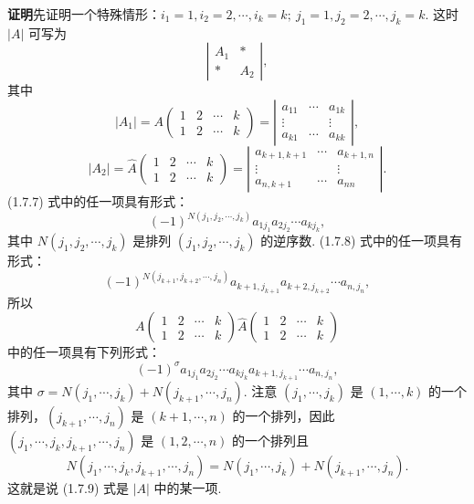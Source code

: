 \documentclass[UTF8, 12pt, fontset=fandol, oneside]{ctexart}
\begin{document}
\noindent\textbf{证明}\quad 先证明一个特殊情形：$i_1=1,i_2=2,\cdots,i_k=k;\ j_1=1,j_2=2,\cdots,j_k=k$. 这时 $|A|$ 可写为
\begin{equation}
\left|\begin{array}{cc}
A_1&*\\
*&A_2
\end{array}\right|,
\tag{1.7.6}
\end{equation}
其中
\begin{equation}
|A_1|=A\left(\begin{array}{cccc}
1&2&\cdots&k\\
1&2&\cdots&k
\end{array}\right)
=
\left|\begin{array}{ccc}
a_{11}&\cdots&a_{1k}\\
\vdots&&\vdots\\
a_{k1}&\cdots&a_{kk}
\end{array}\right|,
\tag{1.7.7}
\end{equation}
\begin{equation}
|A_2|=\widehat{A}\left(\begin{array}{cccc}
1&2&\cdots&k\\
1&2&\cdots&k
\end{array}\right)
=
\left|\begin{array}{ccc}
a_{k+1,k+1}&\cdots&a_{k+1,n}\\
\vdots&&\vdots\\
a_{n,k+1}&\cdots&a_{nn}
\end{array}\right|.
\tag{1.7.8}
\end{equation}
(1.7.7) 式中的任一项具有形式：
\[
(-1)^{N(j_1,j_2,\cdots,j_k)}a_{1j_1}a_{2j_2}\cdots a_{kj_k},
\]
其中 $N(j_1,j_2,\cdots,j_k)$ 是排列 $(j_1,j_2,\cdots,j_k)$ 的逆序数. (1.7.8) 式中的任一项具有形式：
\[
(-1)^{N(j_{k+1},j_{k+2},\cdots,j_n)}a_{k+1,j_{k+1}}a_{k+2,j_{k+2}}\cdots a_{n,j_n},
\]
所以
\[
A\left(\begin{array}{cccc}
1&2&\cdots&k\\
1&2&\cdots&k
\end{array}\right)
\widehat{A}\left(\begin{array}{cccc}
1&2&\cdots&k\\
1&2&\cdots&k
\end{array}\right)
\]
中的任一项具有下列形式：
\begin{equation}
(-1)^\sigma a_{1j_1}a_{2j_2}\cdots a_{kj_k}a_{k+1,j_{k+1}}\cdots a_{n,j_n},
\tag{1.7.9}
\end{equation}
其中 $\sigma=N(j_1,\cdots,j_k)+N(j_{k+1},\cdots,j_n)$. 注意 $(j_1,\cdots,j_k)$ 是 $(1,\cdots,k)$ 的一个排列，$(j_{k+1},\cdots,j_n)$ 是 $(k+1,\cdots,n)$ 的一个排列，因此 $(j_1,\cdots,j_k,j_{k+1},\cdots,j_n)$ 是 $(1,2,\cdots,n)$ 的一个排列且
\[
N(j_1,\cdots,j_k,j_{k+1},\cdots,j_n)=N(j_1,\cdots,j_k)+N(j_{k+1},\cdots,j_n).
\]
这就是说 (1.7.9) 式是 $|A|$ 中的某一项.
\end{document}
